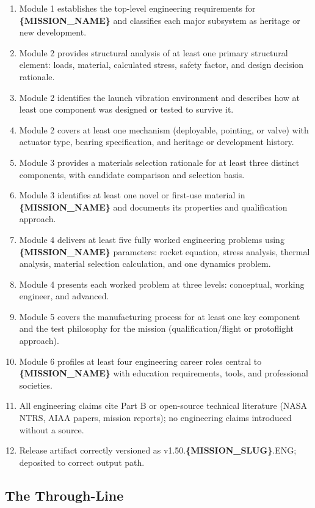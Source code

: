 \documentclass[11pt,letterpaper]{article}
\newcommand{\param}[1]{\textcolor{paramred}{\textbf{\{#1\}}}}
\begin{document}
\begin{enumerate}[leftmargin=*, label=\textbf{SC\arabic*.}]
  \item Module 1 establishes the top-level engineering requirements for \param{MISSION\_NAME} and classifies each major subsystem as heritage or new development.
  \item Module 2 provides structural analysis of at least one primary structural element: loads, material, calculated stress, safety factor, and design decision rationale.
  \item Module 2 identifies the launch vibration environment and describes how at least one component was designed or tested to survive it.
  \item Module 2 covers at least one mechanism (deployable, pointing, or valve) with actuator type, bearing specification, and heritage or development history.
  \item Module 3 provides a materials selection rationale for at least three distinct components, with candidate comparison and selection basis.
  \item Module 3 identifies at least one novel or first-use material in \param{MISSION\_NAME} and documents its properties and qualification approach.
  \item Module 4 delivers at least five fully worked engineering problems using \param{MISSION\_NAME} parameters: rocket equation, stress analysis, thermal analysis, material selection calculation, and one dynamics problem.
  \item Module 4 presents each worked problem at three levels: conceptual, working engineer, and advanced.
  \item Module 5 covers the manufacturing process for at least one key component and the test philosophy for the mission (qualification/flight or protoflight approach).
  \item Module 6 profiles at least four engineering career roles central to \param{MISSION\_NAME} with education requirements, tools, and professional societies.
  \item All engineering claims cite Part B or open-source technical literature (NASA NTRS, AIAA papers, mission reports); no engineering claims introduced without a source.
  \item Release artifact correctly versioned as v1.50.\param{MISSION\_SLUG}.ENG; deposited to correct output path.
\end{enumerate}

\subsection{The Through-Line}
\end{document}
